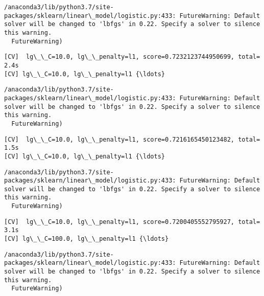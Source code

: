 \documentclass[11pt]{article}
\begin{document}
    \begin{Verbatim}[commandchars=\\\{\}]
/anaconda3/lib/python3.7/site-packages/sklearn/linear\_model/logistic.py:433: FutureWarning: Default solver will be changed to 'lbfgs' in 0.22. Specify a solver to silence this warning.
  FutureWarning)

    \end{Verbatim}

    \begin{Verbatim}[commandchars=\\\{\}]
[CV]  lg\_\_C=10.0, lg\_\_penalty=l1, score=0.7232123744950699, total=   2.4s
[CV] lg\_\_C=10.0, lg\_\_penalty=l1 {\ldots}

    \end{Verbatim}

    \begin{Verbatim}[commandchars=\\\{\}]
/anaconda3/lib/python3.7/site-packages/sklearn/linear\_model/logistic.py:433: FutureWarning: Default solver will be changed to 'lbfgs' in 0.22. Specify a solver to silence this warning.
  FutureWarning)

    \end{Verbatim}

    \begin{Verbatim}[commandchars=\\\{\}]
[CV]  lg\_\_C=10.0, lg\_\_penalty=l1, score=0.7216165450123482, total=   1.5s
[CV] lg\_\_C=10.0, lg\_\_penalty=l1 {\ldots}

    \end{Verbatim}

    \begin{Verbatim}[commandchars=\\\{\}]
/anaconda3/lib/python3.7/site-packages/sklearn/linear\_model/logistic.py:433: FutureWarning: Default solver will be changed to 'lbfgs' in 0.22. Specify a solver to silence this warning.
  FutureWarning)

    \end{Verbatim}

    \begin{Verbatim}[commandchars=\\\{\}]
[CV]  lg\_\_C=10.0, lg\_\_penalty=l1, score=0.7200405552795927, total=   3.1s
[CV] lg\_\_C=100.0, lg\_\_penalty=l1 {\ldots}

    \end{Verbatim}

    \begin{Verbatim}[commandchars=\\\{\}]
/anaconda3/lib/python3.7/site-packages/sklearn/linear\_model/logistic.py:433: FutureWarning: Default solver will be changed to 'lbfgs' in 0.22. Specify a solver to silence this warning.
  FutureWarning)

    \end{Verbatim}
\end{document}
